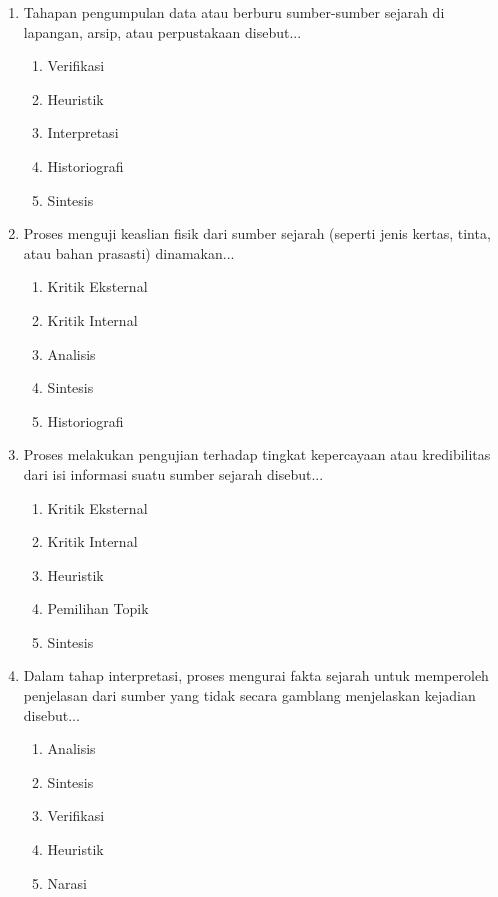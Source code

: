 \documentclass[12pt, a4paper]{article}
\begin{document}
\begin{enumerate}[label=\arabic*.]
    \item Tahapan pengumpulan data atau berburu sumber-sumber sejarah di lapangan, arsip, atau perpustakaan disebut...
    \begin{enumerate}[label=\Alph*.]
        \item Verifikasi
        \item Heuristik
        \item Interpretasi
        \item Historiografi
        \item Sintesis
    \end{enumerate}

    \item Proses menguji keaslian fisik dari sumber sejarah (seperti jenis kertas, tinta, atau bahan prasasti) dinamakan...
    \begin{enumerate}[label=\Alph*.]
        \item Kritik Eksternal
        \item Kritik Internal
        \item Analisis
        \item Sintesis
        \item Historiografi
    \end{enumerate}

    \item Proses melakukan pengujian terhadap tingkat kepercayaan atau kredibilitas dari isi informasi suatu sumber sejarah disebut...
    \begin{enumerate}[label=\Alph*.]
        \item Kritik Eksternal
        \item Kritik Internal
        \item Heuristik
        \item Pemilihan Topik
        \item Sintesis
    \end{enumerate}

    \item Dalam tahap interpretasi, proses mengurai fakta sejarah untuk memperoleh penjelasan dari sumber yang tidak secara gamblang menjelaskan kejadian disebut...
    \begin{enumerate}[label=\Alph*.]
        \item Analisis
        \item Sintesis
        \item Verifikasi
        \item Heuristik
        \item Narasi
    \end{enumerate}


\end{enumerate}
\end{document}
